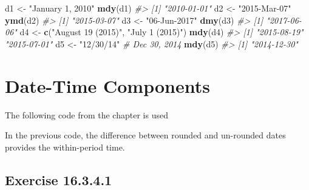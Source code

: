 \documentclass[]{book}
\newenvironment{Shaded}{\begin{snugshade}}{\end{snugshade}}
\newcommand{\CommentTok}[1]{\textcolor[rgb]{0.56,0.35,0.01}{\textit{#1}}}
\newcommand{\DataTypeTok}[1]{\textcolor[rgb]{0.13,0.29,0.53}{#1}}
\newcommand{\KeywordTok}[1]{\textcolor[rgb]{0.13,0.29,0.53}{\textbf{#1}}}
\newcommand{\NormalTok}[1]{#1}
\newcommand{\OperatorTok}[1]{\textcolor[rgb]{0.81,0.36,0.00}{\textbf{#1}}}
\newcommand{\OtherTok}[1]{\textcolor[rgb]{0.56,0.35,0.01}{#1}}
\newcommand{\StringTok}[1]{\textcolor[rgb]{0.31,0.60,0.02}{#1}}
\theoremstyle{plain}
\theoremstyle{remark}
\begin{document}
\begin{Shaded}
\begin{Highlighting}[]
\NormalTok{d1 <-}\StringTok{ "January 1, 2010"}
\KeywordTok{mdy}\NormalTok{(d1)}
\CommentTok{#> [1] "2010-01-01"}
\NormalTok{d2 <-}\StringTok{ "2015-Mar-07"}
\KeywordTok{ymd}\NormalTok{(d2)}
\CommentTok{#> [1] "2015-03-07"}
\NormalTok{d3 <-}\StringTok{ "06-Jun-2017"}
\KeywordTok{dmy}\NormalTok{(d3)}
\CommentTok{#> [1] "2017-06-06"}
\NormalTok{d4 <-}\StringTok{ }\KeywordTok{c}\NormalTok{(}\StringTok{"August 19 (2015)"}\NormalTok{, }\StringTok{"July 1 (2015)"}\NormalTok{)}
\KeywordTok{mdy}\NormalTok{(d4)}
\CommentTok{#> [1] "2015-08-19" "2015-07-01"}
\NormalTok{d5 <-}\StringTok{ "12/30/14"} \CommentTok{# Dec 30, 2014}
\KeywordTok{mdy}\NormalTok{(d5)}
\CommentTok{#> [1] "2014-12-30"}
\end{Highlighting}
\end{Shaded}

\hypertarget{date-time-components}{%
\section{Date-Time Components}\label{date-time-components}}

The following code from the chapter is used

\begin{Shaded}
\end{Shaded}

In the previous code, the difference between rounded and un-rounded dates provides the within-period time.

\hypertarget{exercise-16.3.4.1}{%
\subsection*{\texorpdfstring{Exercise {16.3.4.1}}{Exercise 16.3.4.1}}\label{exercise-16.3.4.1}}
\end{document}
